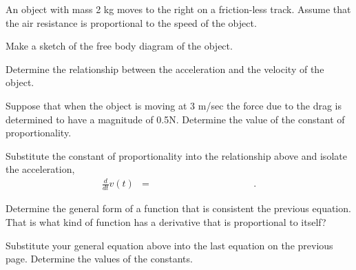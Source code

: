 \begin{problem}
\item An object with mass 2 kg moves to the right on a friction-less
  track. Assume that the air resistance is proportional to the speed
  of the object.

  \begin{subproblem}
  \item Make a sketch of the free body diagram of the object.
    \vfill
  \item Determine the relationship between the acceleration and the
    velocity of the object.
    \vfill
  \item Suppose that when the object is moving at 3 m/sec the force
    due to the drag is determined to have a magnitude of
    0.5N. Determine the value of the constant of proportionality.
    \vfill
  \item Substitute the constant of proportionality into the
    relationship above and isolate the acceleration,
    \begin{eqnarray*}
      \frac{d}{dt} v(t) & = & \hspace{10em}.
    \end{eqnarray*}
  \end{subproblem}

\clearpage

\item Determine the general form of a function that is consistent the
  previous equation. That is what kind of function has a derivative
  that is proportional to itself? 

  \vfill

\item Substitute your general equation above into the last equation on
  the previous page. Determine the values of the constants.

  \vfill

\clearpage

\end{problem}

